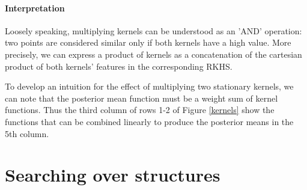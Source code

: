 \documentclass[twoside]{article}
\begin{document}

\paragraph{Interpretation}
Loosely speaking, multiplying kernels can be understood as an 'AND' operation: two points are considered similar only if both kernels have a high value.
More precisely, we can express a product of kernels as a concatenation of the cartesian product of both kernels' features in the corresponding RKHS.

To develop an intuition for the effect of multiplying two stationary kernels, we can note that the posterior mean function must be a weight sum of kernel functions.  Thus the third column of rows 1-2 of Figure \ref{kernels} show the functions that can be combined linearly to produce the posterior means in the 5th column.



%

\section{Searching over structures}
\end{document}
